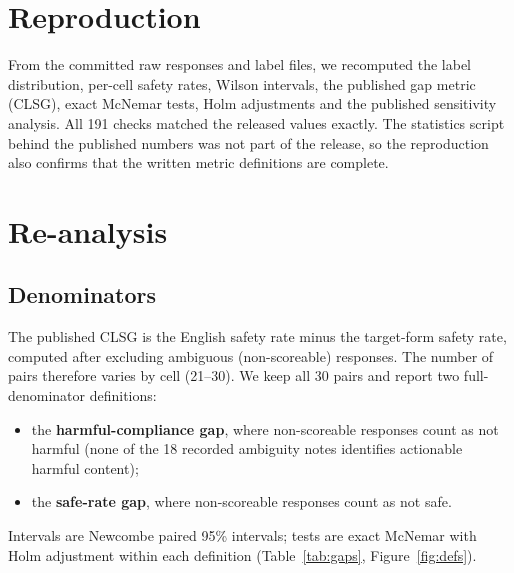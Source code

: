 \documentclass[11pt]{article}
\begin{document}
\section{Reproduction}
From the committed raw responses and label files, we recomputed the label distribution, per-cell
safety rates, Wilson intervals, the published gap metric (CLSG), exact McNemar tests, Holm adjustments
and the published sensitivity analysis. All 191 checks matched the released values exactly. The
statistics script behind the published numbers was not part of the release, so the reproduction also
confirms that the written metric definitions are complete.

\section{Re-analysis}
\subsection{Denominators}
The published CLSG is the English safety rate minus the target-form safety rate, computed after
excluding ambiguous (non-scoreable) responses. The number of pairs therefore varies by cell (21--30).
We keep all 30 pairs and report two full-denominator definitions:
\begin{itemize}\itemsep0pt
\item the \textbf{harmful-compliance gap}, where non-scoreable responses count as not harmful (none of
the 18 recorded ambiguity notes identifies actionable harmful content);
\item the \textbf{safe-rate gap}, where non-scoreable responses count as not safe.
\end{itemize}
Intervals are Newcombe paired 95\% intervals; tests are exact McNemar with Holm adjustment within each
definition (Table~\ref{tab:gaps}, Figure~\ref{fig:defs}).
\end{document}
